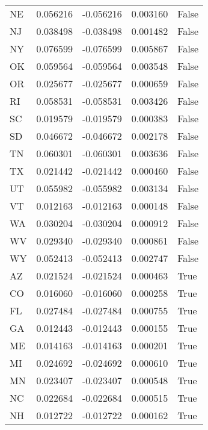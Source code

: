\begin{table}
\begin{tabular}{lrrrl}
      NE &   0.056216 & -0.056216 &       0.003160 &         False \\
      NJ &   0.038498 & -0.038498 &       0.001482 &         False \\
      NY &   0.076599 & -0.076599 &       0.005867 &         False \\
      OK &   0.059564 & -0.059564 &       0.003548 &         False \\
      OR &   0.025677 & -0.025677 &       0.000659 &         False \\
      RI &   0.058531 & -0.058531 &       0.003426 &         False \\
      SC &   0.019579 & -0.019579 &       0.000383 &         False \\
      SD &   0.046672 & -0.046672 &       0.002178 &         False \\
      TN &   0.060301 & -0.060301 &       0.003636 &         False \\
      TX &   0.021442 & -0.021442 &       0.000460 &         False \\
      UT &   0.055982 & -0.055982 &       0.003134 &         False \\
      VT &   0.012163 & -0.012163 &       0.000148 &         False \\
      WA &   0.030204 & -0.030204 &       0.000912 &         False \\
      WV &   0.029340 & -0.029340 &       0.000861 &         False \\
      WY &   0.052413 & -0.052413 &       0.002747 &         False \\
      AZ &   0.021524 & -0.021524 &       0.000463 &          True \\
      CO &   0.016060 & -0.016060 &       0.000258 &          True \\
      FL &   0.027484 & -0.027484 &       0.000755 &          True \\
      GA &   0.012443 & -0.012443 &       0.000155 &          True \\
      ME &   0.014163 & -0.014163 &       0.000201 &          True \\
      MI &   0.024692 & -0.024692 &       0.000610 &          True \\
      MN &   0.023407 & -0.023407 &       0.000548 &          True \\
      NC &   0.022684 & -0.022684 &       0.000515 &          True \\
      NH &   0.012722 & -0.012722 &       0.000162 &          True \\

\end{tabular}
\end{table}
